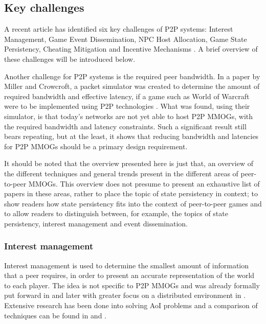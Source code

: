 \documentclass[10pt,a4paper,journal,cspaper,compsoc]{IEEEtran}
\begin{document}
\subsection{Key challenges}
\label{key_challenges}

A recent article has identified six key challenges of P2P systems: Interest Management, Game Event Dissemination, NPC Host Allocation, Game State
Persistency, Cheating Mitigation and Incentive Mechanisms \cite{Fan_deisgn_issues_p2p}. A brief overview of these challenges will be introduced
below.

Another challenge for P2P systems is the required peer bandwidth. In a paper by Miller and Crowcroft, a packet simulator was created to determine the
amount of required bandwidth and effective latency, if a game such as World of Warcraft were to be implemented using P2P technologies
\cite{Miller_p2p_infeasability}. What was found, using their simulator, is that today's networks are not yet able to host P2P MMOGs, with the
required bandwidth and latency constraints. Such a significant result still bears repeating, but at the least, it shows that reducing bandwidth and
latencies for P2P MMOGs should be a primary design requirement.

It should be noted that the overview presented here is just that, an overview of the different techniques and general trends present in the different
areas of peer-to-peer MMOGs. This overview does not presume to present an exhaustive list of papers in these areas, rather to place the topic of
state persistency in context; to show readers how state persistency fits into the context of peer-to-peer games and to allow readers to distinguish
between, for example, the topics of state persistency, interest management and event dissemination.

\subsubsection{Interest management}
\label{key_challenges_im}

Interest management is used to determine the smallest amount of information that a peer requires, in order to present an accurate representation of
the world to each player. The idea is not specific to P2P MMOGs and was already formally put forward in \cite{First_IM} and later with greater focus
on a distributed environment in \cite{Whang_agent_based_IM}. Extensive research has been done into solving AoI problems and a comparison of
techniques can be found in \cite{Boulanger_IM_compare} and \cite{IM_and_ED_survey_Krause}.
\end{document}
